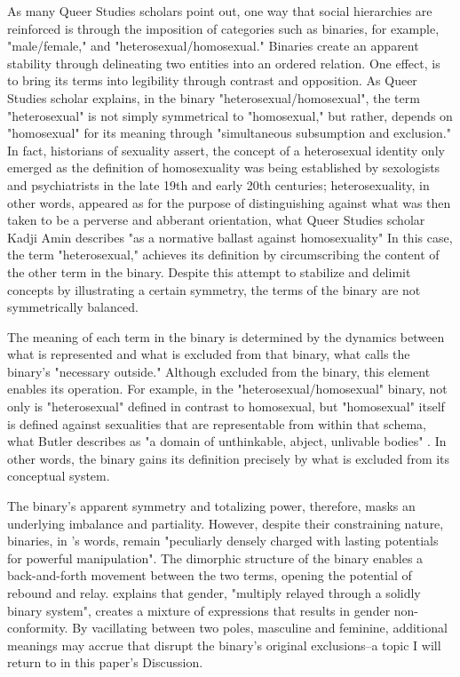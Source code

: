 \documentclass[11pt]{article}
\begin{document}
As many Queer Studies scholars point out, one way that social
hierarchies are reinforced is through the imposition of categories
such as binaries, for example, "male/female," and
"heterosexual/homosexual." Binaries create an apparent stability
through delineating two entities into an ordered relation. One effect,
is to bring its terms into legibility through contrast and opposition.
As Queer Studies scholar \citet{sedgwick:1990} explains, in the binary
"heterosexual/homosexual", the term "heterosexual" is not simply
symmetrical to "homosexual," but rather, depends on "homosexual" for
its meaning through "simultaneous subsumption and exclusion." In fact,
historians of sexuality assert, the concept of a heterosexual identity
only emerged as the definition of homosexuality was being established
by sexologists and psychiatrists in the late 19th and early 20th
centuries; heterosexuality, in other words, appeared as for the
purpose of distinguishing against what was then taken to be a perverse
and abberant orientation, what Queer Studies scholar Kadji Amin
describes "as a normative ballast against
homosexuality" \citep{amin:2022} In this case, the term
"heterosexual," achieves its definition by circumscribing the content
of the other term in the binary. Despite this attempt to stabilize and
delimit concepts by illustrating a certain symmetry, the terms of the
binary are not symmetrically balanced.

The meaning of each term in the binary is determined by the dynamics
between what is represented and what is excluded from that binary,
what \citet{butler:1993} calls the binary's "necessary outside."
Although excluded from the binary, this element enables its operation.
For example, in the "heterosexual/homosexual" binary, not only is
"heterosexual" defined in contrast to homosexual, but "homosexual"
itself is defined against sexualities that are representable from
within that schema, what Butler describes as "a domain of unthinkable,
abject, unlivable bodies" \citep{butler:1993}. In other words, the
binary gains its definition precisely by what is excluded from its
conceptual system.

The binary's apparent symmetry and totalizing power, therefore, masks
an underlying imbalance and partiality. However, despite their
constraining nature, binaries, in \citet{sedgwick:1990}'s words,
remain "peculiarly densely charged with lasting potentials for
powerful manipulation". The dimorphic structure of the binary enables
a back-and-forth movement between the two terms, opening the potential
of rebound and relay. \citet{halberstam:1998} explains that gender,
"multiply relayed through a solidly binary system", creates a mixture
of expressions that results in gender non-conformity. By vacillating
between two poles, masculine and feminine, additional meanings may
accrue that disrupt the binary's original exclusions--a topic I will
return to in this paper's Discussion.
\end{document}
